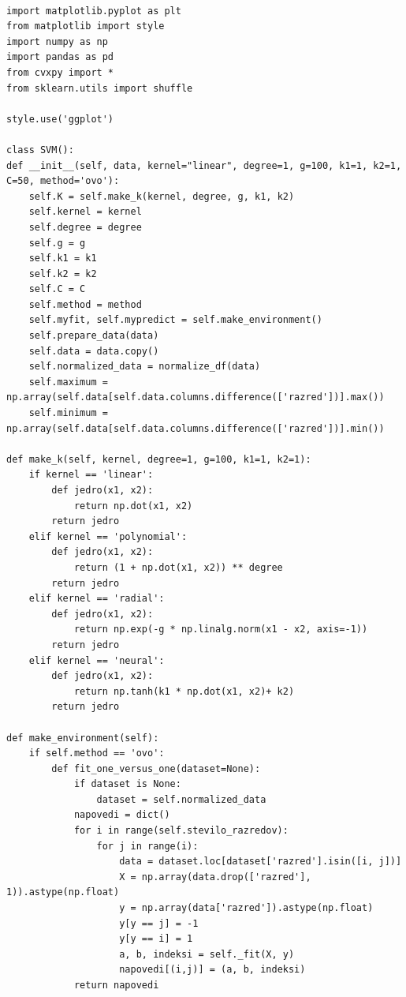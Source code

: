 \documentclass[mat1]{fmfdelo}
\begin{document}
\begin{scriptsize}

\begin{verbatim}

import matplotlib.pyplot as plt
from matplotlib import style
import numpy as np
import pandas as pd
from cvxpy import *
from sklearn.utils import shuffle

style.use('ggplot')

class SVM():
def __init__(self, data, kernel="linear", degree=1, g=100, k1=1, k2=1, C=50, method='ovo'):
    self.K = self.make_k(kernel, degree, g, k1, k2)
    self.kernel = kernel
    self.degree = degree
    self.g = g
    self.k1 = k1
    self.k2 = k2
    self.C = C
    self.method = method
    self.myfit, self.mypredict = self.make_environment()
    self.prepare_data(data)
    self.data = data.copy()
    self.normalized_data = normalize_df(data)
    self.maximum = np.array(self.data[self.data.columns.difference(['razred'])].max())
    self.minimum = np.array(self.data[self.data.columns.difference(['razred'])].min())
 
def make_k(self, kernel, degree=1, g=100, k1=1, k2=1): 
    if kernel == 'linear':
        def jedro(x1, x2):
            return np.dot(x1, x2)
        return jedro
    elif kernel == 'polynomial':
        def jedro(x1, x2):
            return (1 + np.dot(x1, x2)) ** degree
        return jedro
    elif kernel == 'radial':
        def jedro(x1, x2):
            return np.exp(-g * np.linalg.norm(x1 - x2, axis=-1))
        return jedro
    elif kernel == 'neural':
        def jedro(x1, x2):
            return np.tanh(k1 * np.dot(x1, x2)+ k2) 
        return jedro

def make_environment(self): 
    if self.method == 'ovo':
        def fit_one_versus_one(dataset=None):
            if dataset is None:
                dataset = self.normalized_data
            napovedi = dict()
            for i in range(self.stevilo_razredov):
                for j in range(i):
                    data = dataset.loc[dataset['razred'].isin([i, j])]
                    X = np.array(data.drop(['razred'], 1)).astype(np.float)
                    y = np.array(data['razred']).astype(np.float)
                    y[y == j] = -1
                    y[y == i] = 1
                    a, b, indeksi = self._fit(X, y)
                    napovedi[(i,j)] = (a, b, indeksi)
            return napovedi
        

\end{verbatim}
\end{scriptsize}
\end{document}

